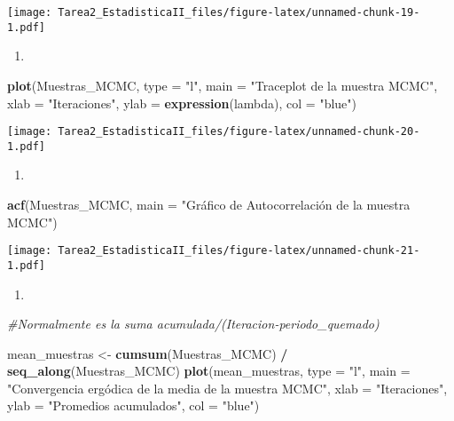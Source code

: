 \documentclass[
]{article}
\newenvironment{Shaded}{\begin{snugshade}}{\end{snugshade}}
\newcommand{\AttributeTok}[1]{\textcolor[rgb]{0.13,0.29,0.53}{#1}}
\newcommand{\CommentTok}[1]{\textcolor[rgb]{0.56,0.35,0.01}{\textit{#1}}}
\newcommand{\FunctionTok}[1]{\textcolor[rgb]{0.13,0.29,0.53}{\textbf{#1}}}
\newcommand{\NormalTok}[1]{#1}
\newcommand{\OtherTok}[1]{\textcolor[rgb]{0.56,0.35,0.01}{#1}}
\newcommand{\SpecialCharTok}[1]{\textcolor[rgb]{0.81,0.36,0.00}{\textbf{#1}}}
\newcommand{\StringTok}[1]{\textcolor[rgb]{0.31,0.60,0.02}{#1}}
\providecommand{\tightlist}{%
  \setlength{\itemsep}{0pt}\setlength{\parskip}{0pt}}
\begin{document}
\texttt{[image: Tarea2\_EstadisticaII\_files/figure-latex/unnamed-chunk-19-1.pdf]}

\begin{enumerate}
\def\labelenumi{\Alph{enumi})}
\setcounter{enumi}{2}
\tightlist
\item
\end{enumerate}

\begin{Shaded}
\begin{Highlighting}[]
\FunctionTok{plot}\NormalTok{(Muestras\_MCMC, }\AttributeTok{type =} \StringTok{"l"}\NormalTok{, }\AttributeTok{main =} \StringTok{"Traceplot de la muestra MCMC"}\NormalTok{,}
     \AttributeTok{xlab =} \StringTok{"Iteraciones"}\NormalTok{, }\AttributeTok{ylab =} \FunctionTok{expression}\NormalTok{(lambda), }\AttributeTok{col =} \StringTok{"blue"}\NormalTok{)}
\end{Highlighting}
\end{Shaded}

\texttt{[image: Tarea2\_EstadisticaII\_files/figure-latex/unnamed-chunk-20-1.pdf]}

\begin{enumerate}
\def\labelenumi{\Alph{enumi})}
\setcounter{enumi}{3}
\tightlist
\item
\end{enumerate}

\begin{Shaded}
\begin{Highlighting}[]
\FunctionTok{acf}\NormalTok{(Muestras\_MCMC, }\AttributeTok{main =} \StringTok{"Gráfico de Autocorrelación de la muestra MCMC"}\NormalTok{)}
\end{Highlighting}
\end{Shaded}

\texttt{[image: Tarea2\_EstadisticaII\_files/figure-latex/unnamed-chunk-21-1.pdf]}

\begin{enumerate}
\def\labelenumi{\Alph{enumi})}
\setcounter{enumi}{4}
\tightlist
\item
\end{enumerate}

\begin{Shaded}
\begin{Highlighting}[]
\CommentTok{\#Normalmente es la suma acumulada/(Iteracion{-}periodo\_quemado)}

\NormalTok{mean\_muestras }\OtherTok{\textless{}{-}} \FunctionTok{cumsum}\NormalTok{(Muestras\_MCMC) }\SpecialCharTok{/} \FunctionTok{seq\_along}\NormalTok{(Muestras\_MCMC)}
\FunctionTok{plot}\NormalTok{(mean\_muestras, }\AttributeTok{type =} \StringTok{"l"}\NormalTok{, }\AttributeTok{main =} \StringTok{"Convergencia ergódica de la media de la muestra MCMC"}\NormalTok{,}
     \AttributeTok{xlab =} \StringTok{"Iteraciones"}\NormalTok{, }\AttributeTok{ylab =} \StringTok{"Promedios acumulados"}\NormalTok{, }\AttributeTok{col =} \StringTok{"blue"}\NormalTok{)}
\end{Highlighting}
\end{Shaded}
\end{document}
